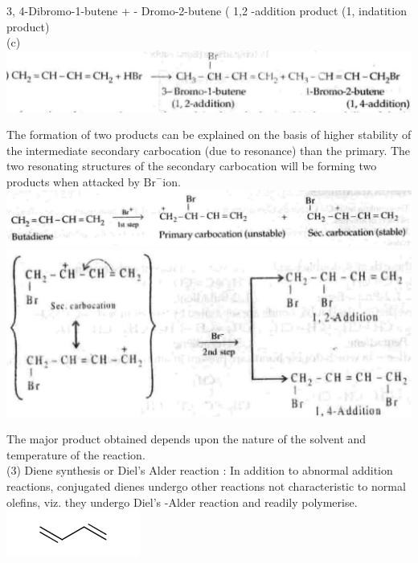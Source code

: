 \documentclass[10pt]{article}
\begin{document}
3, 4-Dibromo-1-butene + - Dromo-2-butene ( 1,2 -addition product (1, indatition product)\\
(c)\\
\includegraphics[max width=\textwidth, center]{2025_01_28_8470952b98110cec3aabg-195(1)}

The formation of two products can be explained on the basis of higher stability of the intermediate secondary carbocation (due to resonance) than the primary. The two resonating structures of the secondary carbocation will be forming two products when attacked by $\mathrm{Br}^{-}$ion.\\
\includegraphics[max width=\textwidth, center]{2025_01_28_8470952b98110cec3aabg-196(2)}\\
\includegraphics[max width=\textwidth, center]{2025_01_28_8470952b98110cec3aabg-196(5)}

The major product obtained depends upon the nature of the solvent and temperature of the reaction.\\
(3) Diene synthesis or Diel's Alder reaction : In addition to abnormal addition reactions, conjugated dienes undergo other reactions not characteristic to normal olefins, viz. they undergo Diel's -Alder reaction and readily polymerise.\\
\includegraphics{smile-c8e87cf21f745f4b1adac63e7bc029ed2d03eea4}
\end{document}
